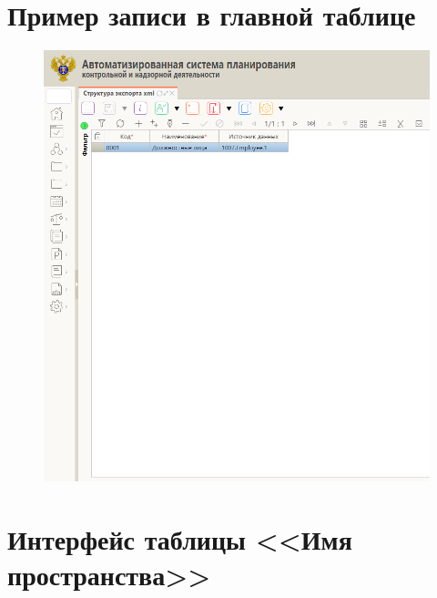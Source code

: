 \documentclass[a4paper,12pt]{diplom}
\begin{document}
\chapter{Пример записи в главной таблице}
\label{V}

\begin{figure}[!ht]
	\centering
	\includegraphics[width=\textwidth]{imgs/main.png}
	\label{fig:1} %
\end{figure}

\chapter{Интерфейс таблицы <<Имя пространства>>}
\label{G}
\end{document}
